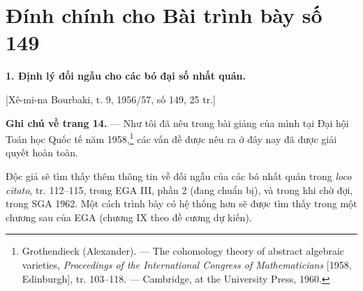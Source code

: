 \clearpage
\chapter*{Đính chính cho Bài trình bày số 149}
\setcounter{footnote}{0}

\noindent\textbf{1. Định lý đối ngẫu cho các bó đại số nhất quán.}

\begin{center}
[Xê-mi-na Bourbaki, t. 9, 1956/57, số 149, 25 tr.]
\end{center}

\noindent\textbf{Ghi chú về trang 14.} --- Như tôi đã nêu trong bài giảng
của mình tại Đại hội Toán học Quốc tế năm 1958,\footnote{
Grothendieck (Alexander). --- The cohomology theory of abstract algebraic
varieties, \emph{Proceedings of the International Congress of Mathematicians}
[1958, Edinburgh], tr. 103--118. --- Cambridge, at the University Press, 1960.}
các vấn đề được nêu ra ở đây nay đã được giải quyết hoàn toàn.

Độc giả sẽ tìm thấy thêm thông tin về đối ngẫu của các bó nhất quán trong
\emph{loco citato}\footnotemark[1], tr. 112--115, trong EGA III, phần 2
(đang chuẩn bị), và trong khi chờ đợi, trong SGA 1962. Một cách trình bày
có hệ thống hơn sẽ được tìm thấy trong một chương sau của EGA
(chương IX theo đề cương dự kiến).

\par
